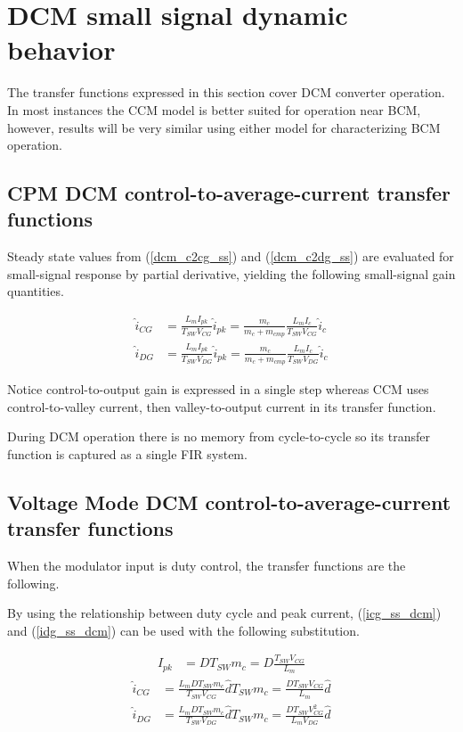 \documentclass{scrartcl}
\begin{document}
\section{DCM small signal dynamic behavior}	
The transfer functions expressed in this section cover DCM converter operation.  In most instances the CCM model is better suited for operation near BCM, however, results will be very similar using either model for characterizing BCM operation.	
	\subsection{CPM DCM control-to-average-current transfer functions }
	Steady state values from (\ref{dcm_c2cg_ss}) and (\ref{dcm_c2dg_ss}) are evaluated for small-signal response by partial derivative, yielding the following small-signal gain quantities.
	
	\begin{align}
	\hat i_{CG} &= \frac{L_mI_{pk}}{T_{SW}V_{CG}}  \hat i_{pk} =  \frac{m_c}{m_c + m_{cmp}}\frac{L_mI_{c}}{T_{SW}V_{CG}} \hat i_{c} \\
	\hat i_{DG} &= \frac{L_mI_{pk}}{T_{SW}V_{DG}} \hat i_{pk} =  \frac{m_c}{m_c + m_{cmp}}\frac{L_mI_{c}}{T_{SW}V_{DG}} \hat i_{c}
	\end{align}
	
	Notice control-to-output gain is expressed in a single step whereas CCM uses control-to-valley current, then valley-to-output current in its transfer function.
	
	During DCM operation there is no memory from cycle-to-cycle so its transfer function is captured as a single FIR system.

	\subsection{Voltage Mode DCM control-to-average-current transfer functions}
	When the modulator input is duty control, the transfer functions are the following.
	
	By using the relationship between duty cycle and peak current, (\ref{icg_ss_dcm}) and (\ref{idg_ss_dcm}) can be used with the following substitution.
	
	\begin{align}
		I_{pk} &= D T_{SW} m_c = D \frac{T_{SW} V_{CG}}{L_m}
	\end{align}
	\begin{align}
	\hat i_{CG} &= \frac{L_m D T_{SW} m_c}{T_{SW}V_{CG}}  \hat d T_{SW} m_c = \frac{ D T_{SW} V_{CG}}{L_m} \hat d \\
	\hat i_{DG} &= \frac{L_m D T_{SW} m_c}{T_{SW}V_{DG}} \hat d T_{SW} m_c = \frac{ D T_{SW} V_{CG}^2}{L_m V_{DG}} \hat d
	\end{align}
	
\end{document}
